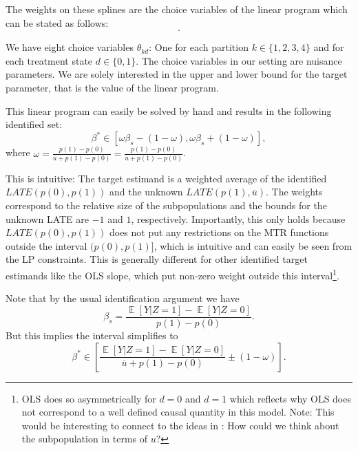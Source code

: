\documentclass[11pt,a4paper,english]{article} %
\DeclareMathOperator*{\E}{\mathbb{E}}
\numberwithin{equation}{section}
\numberwithin{figure}{section}
\numberwithin{table}{section}
\theoremstyle{definition}
\theoremstyle{remark}
\begin{document}
The weights on these splines are the choice variables of the linear program which can be stated as follows:
\begin{equation}
	[\text{Describe LP}].
\end{equation}

We have eight choice variables $\theta_{kd}$: One for each partition $k\in\{1,2,3,4\}$ and for each treatment state $d\in\{0,1\}$.
The choice variables in our setting are nuisance parameters.
We are solely interested in the upper and lower bound for the target parameter, that is the value of the linear program.


This linear program can easily be solved by hand and results in the following identified set:
\begin{equation}
	\beta^* \in [\omega\beta_s - (1 - \omega), \omega\beta_s + (1 - \omega)],
\end{equation}
where $\omega = \frac{p(1) - p(0)}{\overline{u} + p(1) - p(0)} = \frac{p(1) - p(0)}{\overline{u} + p(1) - p(0)}$.

This is intuitive: The target estimand is a weighted average of the identified $LATE(p(0), p(1))$ and the unknown $LATE(p(1), \overline{u})$.
The weights correspond to the relative size of the subpopulations and the bounds for the unknown LATE are $-1$ and $1$, respectively.
Importantly, this only holds because $LATE(p(0), p(1))$ does not put any restrictions on the MTR functions outside the interval $(p(0), p(1)]$, which is intuitive and can easily be seen from the LP constraints.
This is generally different for other identified target estimands like the OLS slope, which put non-zero weight outside this interval\footnote{OLS does so asymmetrically for $d=0$ and $d=1$ which reflects why OLS does not correspond to a well defined causal quantity in this model. Note: This would be interesting to connect to the ideas in \cite{poirier2024quantifying}: How could we think about the subpopulation in terms of $u$?}.


Note that by the usual identification argument we have
\begin{equation}
	\beta_s = \frac{\E\left[Y|Z=1\right] - \E\left[Y|Z=0\right]}{p(1) - p(0)}.
\end{equation}
But this implies the interval simplifies to
\begin{equation}
	\beta^* \in \left[\frac{\E\left[Y|Z=1\right] - \E\left[Y|Z=0\right]}{\overline{u} + p(1) - p(0)} \pm (1 - \omega)\right].
\end{equation}
\end{document}
